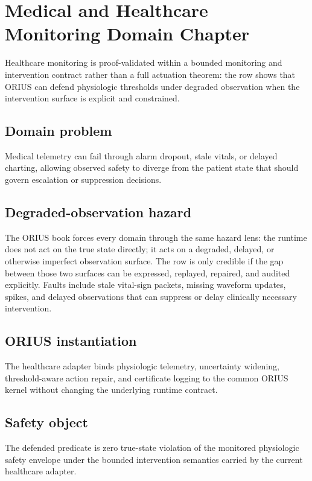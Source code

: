 \chapter{Medical and Healthcare Monitoring Domain Chapter}
\label{ch:domain-healthcare}

Healthcare monitoring is proof-validated within a bounded monitoring and intervention contract rather than a full actuation theorem: the row shows that ORIUS can defend physiologic thresholds under degraded observation when the intervention surface is explicit and constrained.

\section{{Domain problem}}
Medical telemetry can fail through alarm dropout, stale vitals, or delayed charting, allowing observed safety to diverge from the patient state that should govern escalation or suppression decisions.

\section{{Degraded-observation hazard}}
The ORIUS book forces every domain through the same hazard lens: the runtime does not act
on the true state directly; it acts on a degraded, delayed, or otherwise imperfect
observation surface.  The row is only credible if the gap between those two surfaces can
be expressed, replayed, repaired, and audited explicitly.
Faults include stale vital-sign packets, missing waveform updates, spikes, and delayed observations that can suppress or delay clinically necessary intervention.

\section{{ORIUS instantiation}}
The healthcare adapter binds physiologic telemetry, uncertainty widening, threshold-aware action repair, and certificate logging to the common ORIUS kernel without changing the underlying runtime contract.

\section{{Safety object}}
The defended predicate is zero true-state violation of the monitored physiologic safety envelope under the bounded intervention semantics carried by the current healthcare adapter.

